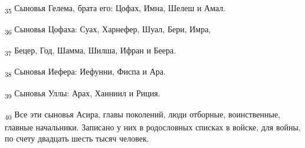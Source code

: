 \begin{tcolorbox}
\textsubscript{35} Сыновья Гелема, брата его: Цофах, Имна, Шелеш и Амал.
\end{tcolorbox}
\begin{tcolorbox}
\textsubscript{36} Сыновья Цофаха: Суах, Харнефер, Шуал, Бери, Имра,
\end{tcolorbox}
\begin{tcolorbox}
\textsubscript{37} Бецер, Год, Шамма, Шилша, Ифран и Беера.
\end{tcolorbox}
\begin{tcolorbox}
\textsubscript{38} Сыновья Иефера: Иефунни, Фиспа и Ара.
\end{tcolorbox}
\begin{tcolorbox}
\textsubscript{39} Сыновья Уллы: Арах, Ханниил и Риция.
\end{tcolorbox}
\begin{tcolorbox}
\textsubscript{40} Все эти сыновья Асира, главы поколений, люди отборные, воинственные, главные начальники. Записано у них в родословных списках в войске, для войны, по счету двадцать шесть тысяч человек.
\end{tcolorbox}
